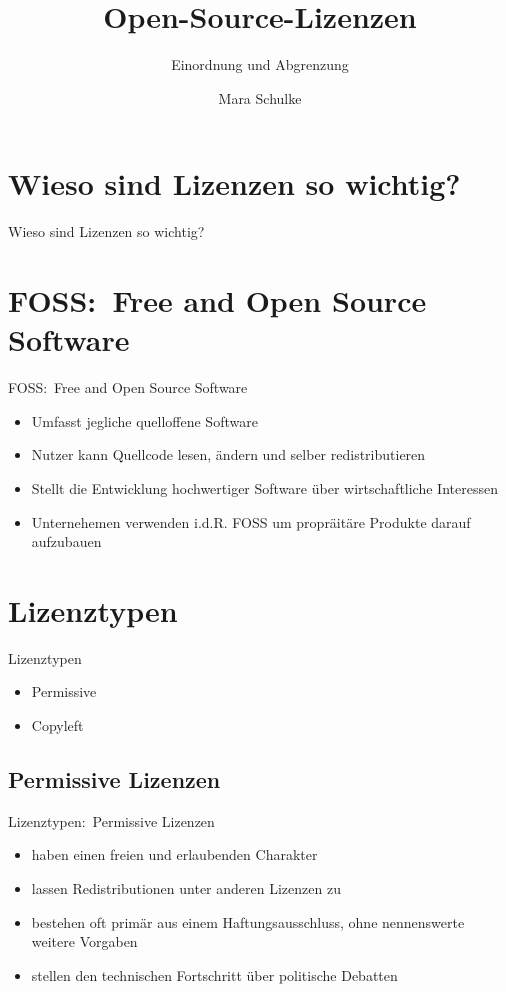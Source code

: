 \documentclass{beamer}
\title{Open-Source-Lizenzen}
\subtitle{Einordnung und Abgrenzung}
\author{Mara Schulke}
\begin{document}
\maketitle

\section{Wieso sind Lizenzen so wichtig?}
\begin{frame}{Wieso sind Lizenzen so wichtig?}
\end{frame}

\section{FOSS:\ Free and Open Source Software}
\begin{frame}{FOSS:\ Free and Open Source Software}
	\begin{itemize}
		\item Umfasst jegliche quelloffene Software
		\item Nutzer kann Quellcode lesen, ändern und selber redistributieren
		\item Stellt die Entwicklung hochwertiger Software über wirtschaftliche
			Interessen
		\item Unternehemen verwenden i.d.R. FOSS um propräitäre Produkte darauf
			aufzubauen
	\end{itemize}
\end{frame}

\section{Lizenztypen}
\begin{frame}{Lizenztypen}
	\begin{itemize}
		\item Permissive
		\item Copyleft
	\end{itemize}
\end{frame}

\subsection{Permissive Lizenzen}
\begin{frame}{Lizenztypen:\ Permissive Lizenzen}
	\begin{itemize}
		\item haben einen freien und erlaubenden Charakter
		\item lassen Redistributionen unter anderen Lizenzen zu
		\item bestehen oft primär aus einem Haftungsausschluss, ohne
			nennenswerte weitere Vorgaben
		\item stellen den technischen Fortschritt über politische Debatten
	\end{itemize}
\end{frame}
\end{document}
